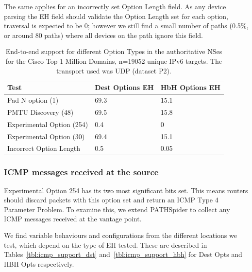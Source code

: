 \documentclass[conference]{IEEEtran}
\begin{document}
The same applies for an incorrectly set Option Length field. As any device parsing the EH field should validate the Option Length set for each option, traversal is expected to be 0; however we still find a small number of paths (0.5\%, or around 80 paths) where all devices on the path ignore this field.

\begin{table}[]
\begin{tabular}{l|l|l}
Test                      & Dest Options EH & HbH Options EH \\
\hline
Pad N option (1)          & 69.3           & 15.1          \\
PMTU Discovery (48)       & 69.5           & 15.8          \\
Experimental Option (254) & 0.4            & 0             \\
Experimental Option (30)  & 69.4           & 15.1          \\
Incorrect Option Length   & 0.5            & 0.05            
\end{tabular}
\label{tbl:option_type_support}
\caption{End-to-end support for different Option Types in the authoritative NSes for the Cisco Top 1 Million Domains, n=19052 unique IPv6 targets. The transport used was UDP (dataset P2).}
\end{table}

\subsubsection{ICMP messages received at the source}

Experimental Option 254 has its two most significant bits set. This means routers should discard packets with this option set and return an ICMP Type 4 Parameter Problem. To examine this, we extend PATHSpider to collect any ICMP messages received at the vantage point. 

We find variable behaviours and configurations from the different locations we test, which depend on the type of EH tested. These are described in Tables~\ref{tbl:icmp_support_dst} and~\ref{tbl:icmp_support_hbh} for Dest Opts and HBH Opts respectively.
\end{document}
